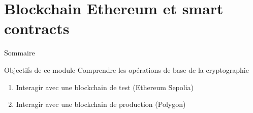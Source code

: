 \section{Blockchain Ethereum et smart contracts}

\begin{frame}{Sommaire}
  \setcounter{tocdepth}{2}
\end{frame}

\begin{frame}{Objectifs de ce module}
  Comprendre les opérations de base de la cryptographie
  \begin{enumerate}
    \item Interagir avec une blockchain de test (Ethereum Sepolia)
    \item Interagir avec une blockchain de production (Polygon)
  \end{enumerate}
\end{frame}



